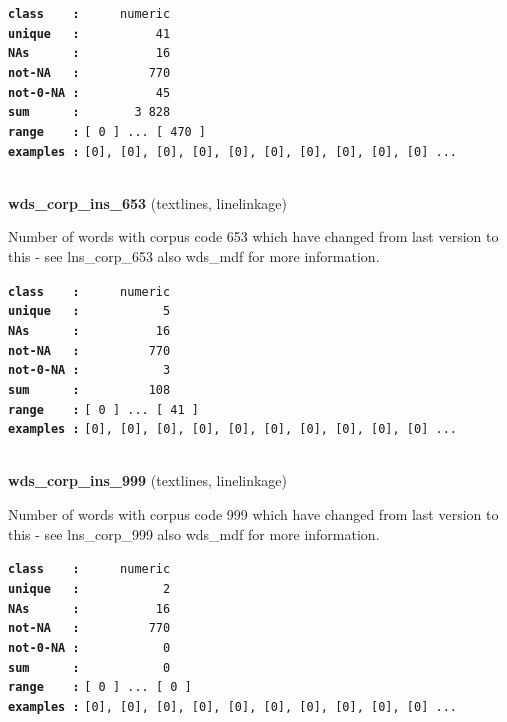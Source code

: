 \documentclass[]{article}
\begin{document}
\textbf{\texttt{class\ \ \ \ :}} \texttt{~~~~~numeric}\\
\textbf{\texttt{unique\ \ \ :}} \texttt{~~~~~~~~~~41}\\
\textbf{\texttt{NAs\ \ \ \ \ \ :}} \texttt{~~~~~~~~~~16}\\
\textbf{\texttt{not-NA\ \ \ :}} \texttt{~~~~~~~~~770}\\
\textbf{\texttt{not-0-NA\ :}} \texttt{~~~~~~~~~~45}\\
\textbf{\texttt{sum\ \ \ \ \ \ :}} \texttt{~~~~~~~3~828}\\
\textbf{\texttt{range\ \ \ \ :}}
\texttt{{[}\ 0\ {]}\ ...\ {[}\ 470\ {]}}\\
\textbf{\texttt{examples\ :}}
\texttt{{[}0{]},\ {[}0{]},\ {[}0{]},\ {[}0{]},\ {[}0{]},\ {[}0{]},\ {[}0{]},\ {[}0{]},\ {[}0{]},\ {[}0{]}\ ...}\\

~

\textbf{wds\_corp\_ins\_653} (textlines, linelinkage)

Number of words with corpus code 653 which have changed from last
version to this - see lns\_corp\_653 also wds\_mdf for more information.

\textbf{\texttt{class\ \ \ \ :}} \texttt{~~~~~numeric}\\
\textbf{\texttt{unique\ \ \ :}} \texttt{~~~~~~~~~~~5}\\
\textbf{\texttt{NAs\ \ \ \ \ \ :}} \texttt{~~~~~~~~~~16}\\
\textbf{\texttt{not-NA\ \ \ :}} \texttt{~~~~~~~~~770}\\
\textbf{\texttt{not-0-NA\ :}} \texttt{~~~~~~~~~~~3}\\
\textbf{\texttt{sum\ \ \ \ \ \ :}} \texttt{~~~~~~~~~108}\\
\textbf{\texttt{range\ \ \ \ :}}
\texttt{{[}\ 0\ {]}\ ...\ {[}\ 41\ {]}}\\
\textbf{\texttt{examples\ :}}
\texttt{{[}0{]},\ {[}0{]},\ {[}0{]},\ {[}0{]},\ {[}0{]},\ {[}0{]},\ {[}0{]},\ {[}0{]},\ {[}0{]},\ {[}0{]}\ ...}\\

~

\textbf{wds\_corp\_ins\_999} (textlines, linelinkage)

Number of words with corpus code 999 which have changed from last
version to this - see lns\_corp\_999 also wds\_mdf for more information.

\textbf{\texttt{class\ \ \ \ :}} \texttt{~~~~~numeric}\\
\textbf{\texttt{unique\ \ \ :}} \texttt{~~~~~~~~~~~2}\\
\textbf{\texttt{NAs\ \ \ \ \ \ :}} \texttt{~~~~~~~~~~16}\\
\textbf{\texttt{not-NA\ \ \ :}} \texttt{~~~~~~~~~770}\\
\textbf{\texttt{not-0-NA\ :}} \texttt{~~~~~~~~~~~0}\\
\textbf{\texttt{sum\ \ \ \ \ \ :}} \texttt{~~~~~~~~~~~0}\\
\textbf{\texttt{range\ \ \ \ :}}
\texttt{{[}\ 0\ {]}\ ...\ {[}\ 0\ {]}}\\
\textbf{\texttt{examples\ :}}
\texttt{{[}0{]},\ {[}0{]},\ {[}0{]},\ {[}0{]},\ {[}0{]},\ {[}0{]},\ {[}0{]},\ {[}0{]},\ {[}0{]},\ {[}0{]}\ ...}\\
\end{document}
